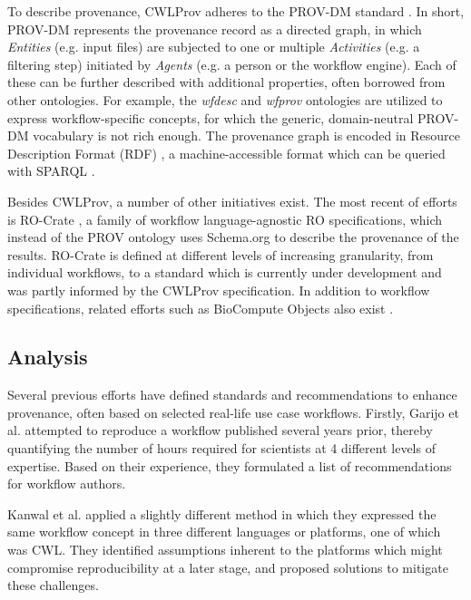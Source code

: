 To describe provenance, CWLProv adheres to the PROV-DM standard \cite{moreauPROVDMPROVData2013}. In short, PROV-DM represents the provenance record as a directed graph, in which \emph{Entities} (e.g. input files) are subjected to one or multiple \emph{Activities} (e.g. a filtering step) initiated by \emph{Agents} (e.g. a person or the workflow engine). Each of these can be further described with additional properties, often borrowed from other ontologies. For example, the \emph{wfdesc} \cite{soiland-reyesWfdescOntology2016} and \emph{wfprov} \cite{soiland-reyesWfprovOntology2016} ontologies are utilized to express workflow-specific concepts, for which the generic, domain-neutral PROV-DM vocabulary is not rich enough. The provenance graph is encoded in Resource Description Format (RDF) \cite{cyganiakRDFConceptsAbstract2014}, a machine-accessible format which can be queried with SPARQL \cite{thew3csparqlworkinggroupSPARQLOverview2013}.

Besides CWLProv, a number of other initiatives exist. The most recent of efforts is RO-Crate \cite{soiland-reyesPackagingResearchArtefacts2022}, a family of workflow language-agnostic RO specifications, which instead of the PROV ontology uses Schema.org to describe the provenance of the results. RO-Crate is defined at different levels of increasing granularity, from individual workflows, to a standard which is currently under development and was partly informed by the CWLProv specification. In addition to workflow specifications, related efforts such as BioCompute Objects also exist \cite{alterovitzEnablingPrecisionMedicine2018}. 

\subsection{Analysis}

Several previous efforts have defined standards and recommendations to enhance provenance, often based on selected real-life use case workflows. Firstly, Garijo et al. \cite{garijoQuantifyingReproducibilityComputational2013} attempted to reproduce a workflow published several years prior, thereby quantifying the number of hours required for scientists at 4 different levels of expertise. Based on their experience, they formulated a list of recommendations for workflow authors. 

Kanwal et al. \cite{kanwalInvestigatingReproducibilityTracking2017} applied a slightly different method in which they expressed the same workflow concept in three different languages or platforms, one of which was CWL. They identified assumptions inherent to the platforms which might compromise reproducibility at a later stage, and proposed solutions to mitigate these challenges. 

